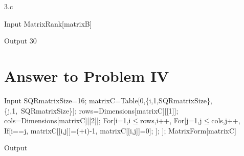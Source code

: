 \documentclass[11pt,a4paper]{article}
\begin{document}
3.c

\begin{mmaCell}[moredefined={matrixB}]{Input}
MatrixRank[matrixB]
\end{mmaCell}

\begin{mmaCell}{Output}
30
\end{mmaCell}

\clearpage
\section{Answer to Problem IV}\label{sec:P04}

\begin{mmaCell}[moredefined={SQRmatrixSize, matrixC, i, j, rows, cols}]{Input}
SQRmatrixSize=16;
matrixC=Table[0,\{i,1,SQRmatrixSize\},\{j,1,\
SQRmatrixSize\}];
rows=Dimensions[matrixC][[1]];
cols=Dimensions[matrixC][[2]];
For[i=1,i\(\pmb{\leq}\)rows,i++,
  For[j=1,j\(\pmb{\leq}\)cols,j++,
    If[i==j,
      matrixC[[i,j]]=(\mmaDef{\(\pmb{\pi}\)}+i)-1,
      matrixC[[i,j]]=0];
  ];
];
MatrixForm[matrixC]
\end{mmaCell}

\begin{mmaCell}[form=MatrixForm]{Output}

\end{mmaCell}
\end{document}

